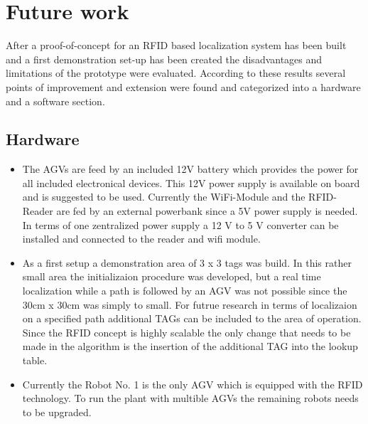 \section{Future work}\label{Sec_fut}
After a proof-of-concept for an RFID based localization system has been built and a first demonstration set-up has been created the disadvantages and limitations of the prototype were evaluated. According to these results several points of improvement and extension were found and categorized into a hardware and a software section. 
\subsection{Hardware}
\begin{itemize}
\item The AGVs are feed by an included 12V battery which provides the power for all included electronical devices. This 12V power supply is available on board and is suggested to be used. Currently the WiFi-Module and the RFID-Reader are fed by an external powerbank since a 5V power supply is needed. In terms of one zentralized power supply a 12 V to 5 V converter can be installed and connected to the reader and wifi module.
\item As a first setup a demonstration area of 3 x 3 tags was build. In this rather small area the initializaion procedure was developed, but a real time localization while a path is followed by an AGV was not possible since the 30cm x 30cm was simply to small. For futrue research in terms of localizaion on a specified path additional TAGs can be included to the area of operation. Since the RFID concept is highly scalable the only change that needs to be made in the algorithm is the insertion of the additional TAG into the lookup table.
\item Currently the Robot No. 1 is the only AGV which is equipped with the RFID technology. To run the plant with multible AGVs the remaining robots needs to be upgraded.\\
\end{itemize}
